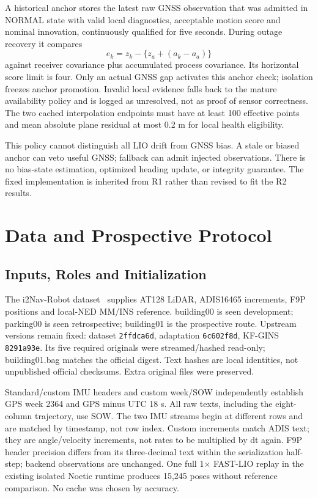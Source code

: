 \documentclass[conference]{IEEEtran}
\begin{document}
A historical anchor stores the latest raw GNSS observation that was admitted in NORMAL state with valid local diagnostics, acceptable motion score and nominal innovation, continuously qualified for five seconds. During outage recovery it compares
\begin{equation}
 e_k=z_k-\{z_a+(a_k-a_a)\}
\end{equation}
against receiver covariance plus accumulated process covariance. Its horizontal score limit is four. Only an actual GNSS gap activates this anchor check; isolation freezes anchor promotion. Invalid local evidence falls back to the mature availability policy and is logged as unresolved, not as proof of sensor correctness. The two cached interpolation endpoints must have at least 100 effective points and mean absolute plane residual at most 0.2 m for local health eligibility.

This policy cannot distinguish all LIO drift from GNSS bias. A stale or biased anchor can veto useful GNSS; fallback can admit injected observations. There is no bias-state estimation, optimized heading update, or integrity guarantee. The fixed implementation is inherited from R1 rather than revised to fit the R2 results.


\section{Data and Prospective Protocol}
\subsection{Inputs, Roles and Initialization}
The i2Nav-Robot dataset~\cite{i2nav} supplies AT128 LiDAR, ADIS16465 increments, F9P positions and local-NED MM/INS reference. building00 is seen development; parking00 is seen retrospective; building01 is the prospective route. Upstream versions remain fixed: dataset \texttt{2ffdca6d}, adaptation \texttt{6c602f8d}, KF-GINS \texttt{8291a93e}. Its five required originals were streamed/hashed read-only; building01.bag matches the official digest. Text hashes are local identities, not unpublished official checksums. Extra original files were preserved.

Standard/custom IMU headers and custom week/SOW independently establish GPS week 2364 and GPS minus UTC 18 s. All raw texts, including the eight-column trajectory, use SOW. The two IMU streams begin at different rows and are matched by timestamp, not row index. Custom increments match ADIS text; they are angle/velocity increments, not rates to be multiplied by dt again. F9P header precision differs from its three-decimal text within the serialization half-step; backend observations are unchanged. One full 1$\times$ FAST-LIO replay in the existing isolated Noetic runtime produces 15,245 poses without reference comparison. No cache was chosen by accuracy.
\end{document}
